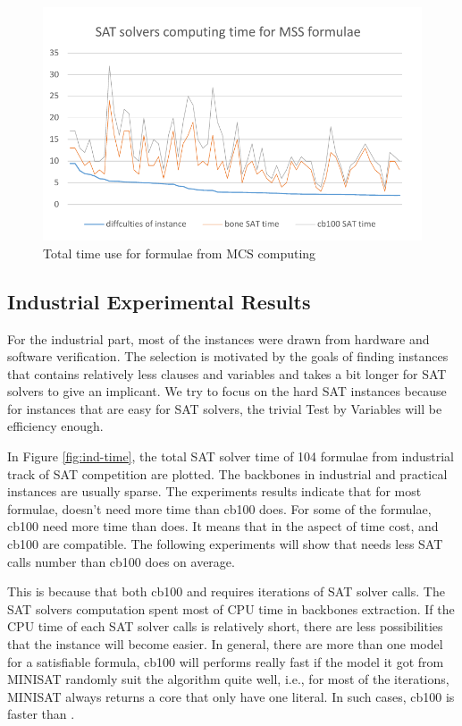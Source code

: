\begin{figure}
    \centering
    \includegraphics[scale=0.7]{mcs.pdf}
   \caption{Total time use for formulae from MCS computing}
   \label{fig:mcs-time}
\end{figure}

\subsection{Industrial Experimental Results}

For the industrial part, most of the instances were drawn from hardware and software verification. The selection is motivated by the goals of finding instances that contains relatively less clauses and variables and takes a bit longer for SAT solvers to give an implicant. We try to focus on the hard SAT instances because for instances that are easy for SAT solvers, the trivial Test by Variables will be efficiency enough.

In Figure \ref{fig:ind-time}, the total SAT solver time of 104 formulae from industrial track of SAT competition are plotted. The backbones in industrial and practical instances are usually sparse. The experiments results indicate that for most formulae, \tool doesn't need more time than cb100 does. For some of the formulae, cb100 need more time than \tool does. It means that in the aspect of time cost, \tool and cb100 are compatible. The following experiments will show that \tool needs less SAT calls number than cb100 does on average.

This is because that both cb100 and \tool requires iterations of SAT solver calls. The SAT solvers computation spent most of CPU time in backbones extraction. If the CPU time of each SAT solver calls is relatively short, there are less possibilities that the instance will become easier. In general, there are more than one model for a satisfiable formula, cb100 will performs really fast if the model it got from MINISAT randomly suit the algorithm quite well, i.e., for most of the iterations, MINISAT always returns a core that only have one literal. In such cases, cb100 is faster than \tool.

